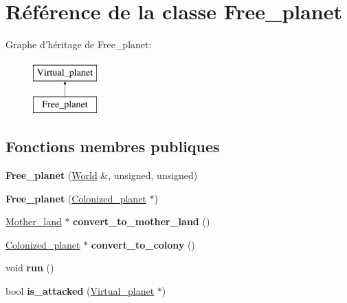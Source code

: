 \hypertarget{classFree__planet}{\section{Référence de la classe Free\-\_\-planet}
\label{classFree__planet}
}
Graphe d'héritage de Free\-\_\-planet\-:\begin{figure}[H]
\begin{center}
\leavevmode
\includegraphics[height=2.000000cm]{classFree__planet}
\end{center}
\end{figure}
\subsection*{Fonctions membres publiques}
\begin{DoxyCompactItemize}
\item 
\hypertarget{classFree__planet_a7dfd0b5e9f41d84aba7ff721ec7a148e}{{\bfseries Free\-\_\-planet} (\hyperlink{classWorld}{World} \&, unsigned, unsigned)}\label{classFree__planet_a7dfd0b5e9f41d84aba7ff721ec7a148e}

\item 
\hypertarget{classFree__planet_a40c231f6f967b35b0c13cb9f883bafe2}{{\bfseries Free\-\_\-planet} (\hyperlink{classColonized__planet}{Colonized\-\_\-planet} $\ast$)}\label{classFree__planet_a40c231f6f967b35b0c13cb9f883bafe2}

\item 
\hypertarget{classFree__planet_a9c4b4b2c39c8c2646b6caad23cbaf5f1}{\hyperlink{classMother__land}{Mother\-\_\-land} $\ast$ {\bfseries convert\-\_\-to\-\_\-mother\-\_\-land} ()}\label{classFree__planet_a9c4b4b2c39c8c2646b6caad23cbaf5f1}

\item 
\hypertarget{classFree__planet_ae7bf8b964c3ac1be2390df0d5cc0c961}{\hyperlink{classColonized__planet}{Colonized\-\_\-planet} $\ast$ {\bfseries convert\-\_\-to\-\_\-colony} ()}\label{classFree__planet_ae7bf8b964c3ac1be2390df0d5cc0c961}

\item 
\hypertarget{classFree__planet_a5ca63c483955025b2955eb35fea0f4e8}{void {\bfseries run} ()}\label{classFree__planet_a5ca63c483955025b2955eb35fea0f4e8}

\item 
\hypertarget{classFree__planet_a205f5d75e430e9884b950b7bc1a3fe9d}{bool {\bfseries is\-\_\-attacked} (\hyperlink{classVirtual__planet}{Virtual\-\_\-planet} $\ast$)}\label{classFree__planet_a205f5d75e430e9884b950b7bc1a3fe9d}

\end{DoxyCompactItemize}
